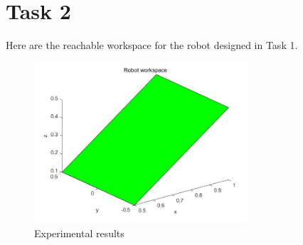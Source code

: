 \section{Task 2}
\FloatBarrier %

Here are the reachable workspace for the robot designed in Task 1.


\begin{figure}[htbp]
    \centering
    \includegraphics[width=8cm]{./fig/workspace.jpg}
    \caption{Experimental results}
    \label{f5}
\end{figure}





